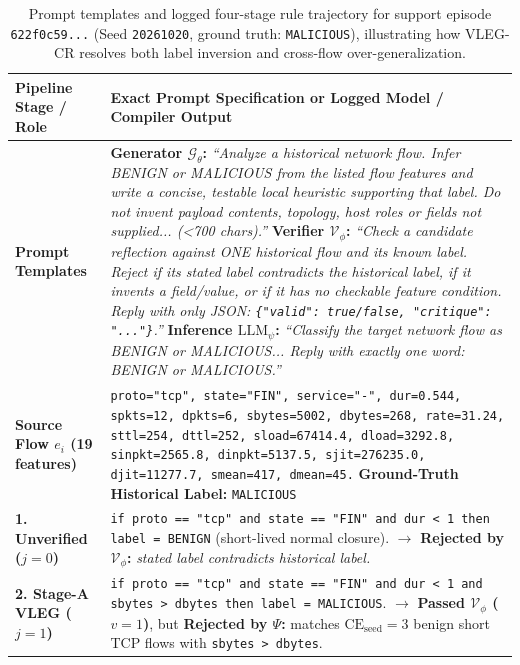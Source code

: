 \documentclass[11pt,letterpaper,onecolumn]{article}
\begin{document}
\begin{table}[tbp]
\centering
\caption{Prompt templates and logged four-stage rule trajectory for support episode \texttt{622f0c59...} (Seed \texttt{20261020}, ground truth: \texttt{MALICIOUS}), illustrating how VLEG-CR resolves both label inversion and cross-flow over-generalization.}
\label{tab:case_study}
\footnotesize
\begin{tabularx}{0.98\textwidth}{@{}p{3.0cm}X@{}}
\toprule
\textbf{Pipeline Stage / Role} & \textbf{Exact Prompt Specification or Logged Model / Compiler Output} \\
\midrule
\textbf{Prompt Templates} & \textbf{Generator $\mathcal{G}_\theta$:} \emph{``Analyze a historical network flow. Infer BENIGN or MALICIOUS from the listed flow features and write a concise, testable local heuristic supporting that label. Do not invent payload contents, topology, host roles or fields not supplied... (<700 chars).''} \newline
\textbf{Verifier $\mathcal{V}_\phi$:} \emph{``Check a candidate reflection against ONE historical flow and its known label. Reject if its stated label contradicts the historical label, if it invents a field/value, or if it has no checkable feature condition. Reply with only JSON: \texttt{\{"valid": true/false, "critique": "..."\}}.''} \newline
\textbf{Inference $\mathrm{LLM}_\psi$:} \emph{``Classify the target network flow as BENIGN or MALICIOUS... Reply with exactly one word: BENIGN or MALICIOUS.''} \\
\midrule
\textbf{Source Flow $e_i$ (19 features)} & \texttt{proto="tcp", state="FIN", service="-", dur=0.544, spkts=12, dpkts=6, sbytes=5002, dbytes=268, rate=31.24, sttl=254, dttl=252, sload=67414.4, dload=3292.8, sinpkt=2565.8, dinpkt=5137.5, sjit=276235.0, djit=11277.7, smean=417, dmean=45.} \newline
\textbf{Ground-Truth Historical Label:} \texttt{MALICIOUS} \\
\midrule
\textbf{1. Unverified ($j=0$)} & \texttt{if proto == "tcp" and state == "FIN" and dur < 1 then label = BENIGN} (short-lived normal closure). $\rightarrow$ \textbf{Rejected by $\mathcal{V}_\phi$:} \emph{stated label contradicts historical label.} \\
\textbf{2. Stage-A VLEG ($j=1$)} & \texttt{if proto == "tcp" and state == "FIN" and dur < 1 and sbytes > dbytes then label = MALICIOUS}. $\rightarrow$ \textbf{Passed $\mathcal{V}_\phi$ ($v=1$)}, but \textbf{Rejected by $\Psi$:} matches $\mathrm{CE}_{\mathrm{seed}} = 3$ benign short TCP flows with \texttt{sbytes > dbytes}. \\

\end{tabularx}
\end{table}
\end{document}

